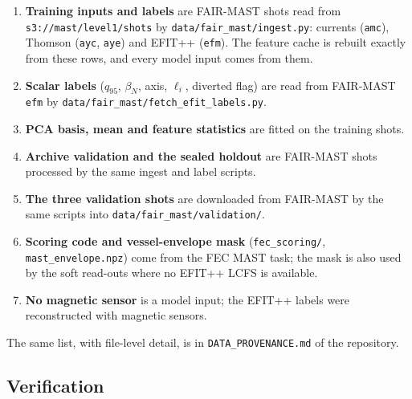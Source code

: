 \documentclass[11pt,a4paper]{article}
\numberwithin{equation}{section}
\begin{document}
\begin{enumerate}
\def\labelenumi{\arabic{enumi}.}
\item
  \textbf{Training inputs and labels} are FAIR-MAST shots read from \nolinkurl{s3://mast/level1/shots} by \nolinkurl{data/fair_mast/ingest.py}: currents (\texttt{amc}), Thomson (\texttt{ayc}, \texttt{aye}) and EFIT++ (\texttt{efm}). The feature cache is rebuilt exactly from these rows, and every model input comes from them.
\item
  \textbf{Scalar labels} (\(q_{95}\), \(\beta_N\), axis, \(\ell_i\), diverted flag) are read from FAIR-MAST \texttt{efm} by \nolinkurl{data/fair_mast/fetch_efit_labels.py}.
\item
  \textbf{PCA basis, mean and feature statistics} are fitted on the training shots.
\item
  \textbf{Archive validation and the sealed holdout} are FAIR-MAST shots processed by the same ingest and label scripts.
\item
  \textbf{The three validation shots} are downloaded from FAIR-MAST by the same scripts into \nolinkurl{data/fair_mast/validation/}.
\item
  \textbf{Scoring code and vessel-envelope mask} (\nolinkurl{fec_scoring/}, \nolinkurl{mast_envelope.npz}) come from the FEC MAST task; the mask is also used by the soft read-outs where no EFIT++ LCFS is available.
\item
  \textbf{No magnetic sensor} is a model input; the EFIT++ labels were reconstructed with magnetic sensors.
\end{enumerate}

The same list, with file-level detail, is in \nolinkurl{DATA_PROVENANCE.md} of the repository.

\hypertarget{verification}{%
\subsection{Verification}\label{verification}}
\end{document}
